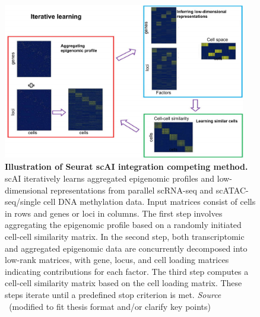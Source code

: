 \begin{figure}[!ht]
	\centering
	\includegraphics[width=0.95\textwidth]{Alg_scAI/fig}
	\vspace{0.1cm}
	\caption[Illustration of Seurat scAI integration competing method.]{\textbf{Illustration of Seurat scAI integration competing method.} scAI iteratively learns aggregated epigenomic profiles and low-dimensional representations from parallel scRNA-seq and scATAC-seq/single cell DNA methylation data. Input matrices consist of cells in rows and genes or loci in columns. The first step involves aggregating the epigenomic profile based on a randomly initiated cell-cell similarity matrix. In the second step, both transcriptomic and aggregated epigenomic data are concurrently decomposed into low-rank matrices, with gene, locus, and cell loading matrices indicating contributions for each factor. The third step computes a cell-cell similarity matrix based on the cell loading matrix. These steps iterate until a predefined stop criterion is met. \emph{Source ~\cite{jin2020scaio}}(modified to fit thesis format and/or clarify key points)
}
	\label{fig:Alg_scAI}
\end{figure}

